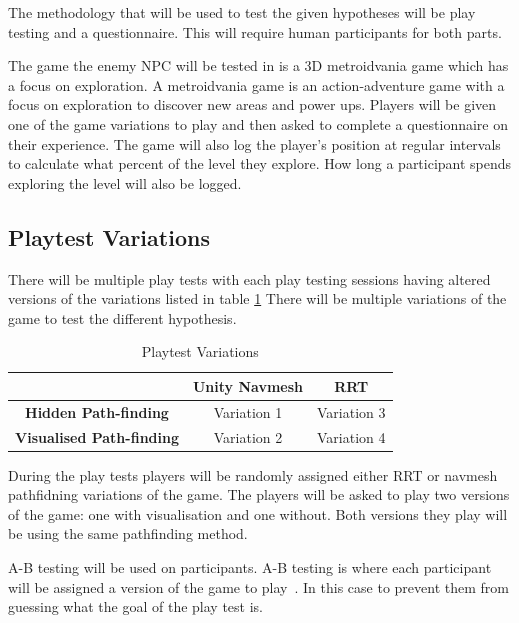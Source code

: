 \documentclass[journal]{IEEEtran}
\begin{document}

The methodology that will be used to test the given hypotheses will be play testing and a questionnaire. This will require human participants for both parts.

The game the enemy NPC will be tested in is a 3D metroidvania game which has a focus on exploration. A metroidvania game is an action-adventure game with a focus on exploration to discover new areas and power ups. Players will be given one of the game variations to play and then asked to complete a questionnaire on their experience. The game will also log the player's position at regular intervals to calculate what percent of the level they explore. How long a participant spends exploring the level will also be logged.

\subsection{Playtest Variations}
There will be multiple play tests with each play testing sessions having altered versions of the variations listed in table \ref{table:PlaytestVariations} 
There will be multiple variations of the game to test the different hypothesis. 


\begin{table}[ht]
	\centering
	\caption{Playtest Variations}
	\label{table:PlaytestVariations}
	\def\arraystretch{1.5}
	\begin{tabular}{ |c |c |c |}
		\hline
			  							& \textbf{Unity Navmesh}& \textbf{RRT} \\
		\hline
		\textbf{Hidden Path-finding}	& Variation 1			& Variation 3 \\
		\hline
		\textbf{Visualised Path-finding}& Variation 2		  	& Variation 4 \\
		\hline
	\end{tabular}
\end{table}

During the play tests players will be randomly assigned either RRT or navmesh pathfidning variations of the game. The players will be asked to play two versions of the game: one with visualisation and one without. Both versions they play will be using the same pathfinding method.

A-B testing will be used on participants. A-B testing is where each participant will be assigned a version of the game to play~\cite{Hynninen2014}. In this case to prevent them from guessing what the goal of the play test is. 
\end{document}

